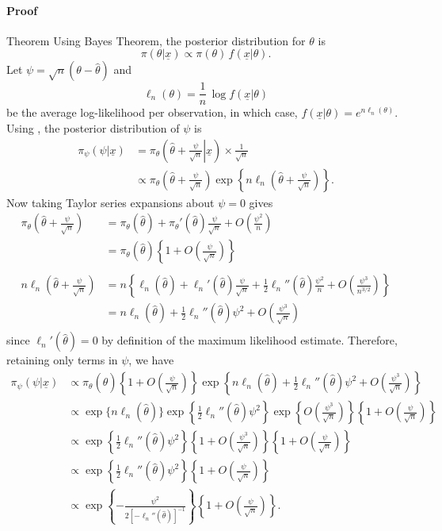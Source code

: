 \paragraph{Proof}{Theorem}{}
Using Bayes Theorem, the posterior distribution for $\theta$ is
$$\pi(\theta|\underline{x}) \propto\pi(\theta)\,f(\underline{x}|\theta).$$
Let $\psi=\sqrt{n}(\theta-\hat\theta)$ and
$$\ell_n(\theta) =\frac{1}{n}\,\log f(\underline{x}|\theta) $$
be the average log-likelihood per observation, in which
case, $f(\underline{x}|\theta)=e^{n\ell_n(\theta)}$. Using ,
the posterior distribution of $\psi$ is
\begin{align*}
\pi_\psi(\psi|\underline{x})
&=\pi_\theta\left(\hat\theta+\left.\frac{\psi}{\sqrt{n}}\right|\underline{x}\right)
\times\frac{1}{\sqrt{n}} \\
&\propto\pi_\theta\left(\hat\theta+\frac{\psi}{\sqrt{n}}\right)
\exp\left\{n\ell_n\left(\hat\theta+\frac{\psi}{\sqrt{n}}\right)\right\}.
\end{align*}
Now taking Taylor series expansions about $\psi=0$ gives
\begin{align*}
\pi_\theta\left(\hat\theta+\frac{\psi}{\sqrt{n}}\right)
&=\pi_\theta(\hat\theta)+
\pi_\theta'(\hat\theta)\frac{\psi}{\sqrt{n}}
+O\left(\frac{\psi^2}{n}\right) \\
&=\pi_\theta(\hat\theta)\left\{1+O\left(\frac{\psi}{\sqrt{n}}\right)\right\}
\\ \\
n\ell_n\left(\hat\theta+\frac{\psi}{\sqrt{n}}\right)
&=n\left\{\ell_n(\hat\theta)+
\ell_n'(\hat\theta)\frac{\psi}{\sqrt{n}}+
\frac{1}{2}\ell_n''(\hat\theta)\frac{\psi^2}{n}
+O\left(\frac{\psi^3}{n^{3/2}}\right)\right\} \\
&=n\ell_n(\hat\theta)+\frac{1}{2}
\ell_n''(\hat\theta)\psi^2+O\left(\frac{\psi^3}{\sqrt{n}}\right) \\
\end{align*}
since $\ell_n'(\hat\theta)=0$ by definition of the maximum likelihood
estimate. Therefore, retaining only terms in $\psi$, we have
\begin{align*}
\pi_\psi(\psi|\underline{x})
&\propto
\pi_\theta(\hat\theta)\left\{1+O\left(\frac{\psi}{\sqrt{n}}\right)\right\}
\exp\left\{n\ell_n(\hat\theta)+\frac{1}{2}
\ell_n''(\hat\theta)\psi^2+O\left(\frac{\psi^3}{\sqrt{n}}\right)\right\} \\
&\propto
\exp\{n\ell_n(\hat\theta)\}
\exp\left\{\frac{1}{2}\ell_n''(\hat\theta)\psi^2\right\}
\exp\left\{O\left(\frac{\psi^3}{\sqrt{n}}\right)\right\}
\left\{1+O\left(\frac{\psi}{\sqrt{n}}\right)\right\} \\
&\propto
\exp\left\{\frac{1}{2}\ell_n''(\hat\theta)\psi^2\right\}
\left\{1+O\left(\frac{\psi^3}{\sqrt{n}}\right)\right\}
\left\{1+O\left(\frac{\psi}{\sqrt{n}}\right)\right\} \\
&\propto
\exp\left\{\frac{1}{2}\ell_n''(\hat\theta)\psi^2\right\}
\left\{1+O\left(\frac{\psi}{\sqrt{n}}\right)\right\} \\
&\propto
\exp\left\{-\frac{\psi^2}{2[-\ell_n''(\hat\theta)]^{-1}}\right\}
\left\{1+O\left(\frac{\psi}{\sqrt{n}}\right)\right\}. 
\end{align*}

